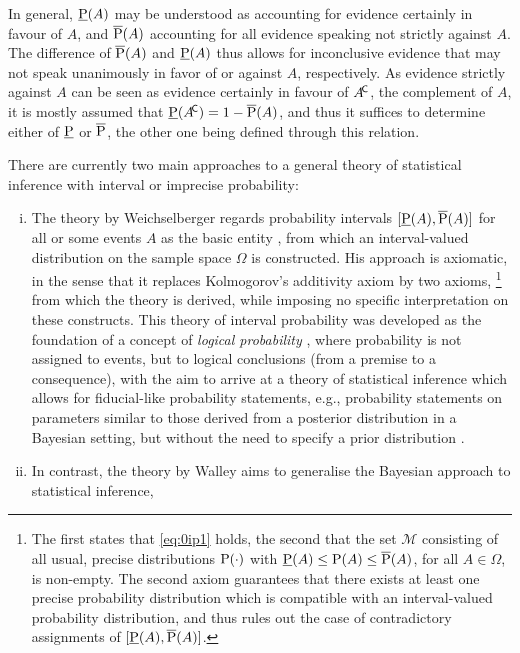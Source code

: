 In general, $\underline{\operatorname{P}}(A)$ may be understood as accounting for evidence certainly in favour of $A$,
and $\overline{\operatorname{P}}(A)$ accounting for all evidence speaking not strictly against $A$.
The difference of $\overline{\operatorname{P}}(A)$ and $\underline{\operatorname{P}}(A)$ thus allows for inconclusive evidence
that may not speak unanimously in favor of or against $A$, respectively.
As evidence strictly against $A$ can be seen as evidence certainly in favour of $A^{{\mbox{\!\scriptsize\textsf{C}}}}$,
the complement of $A$,
it is mostly assumed that $\underline{\operatorname{P}}(A^{{\mbox{\!\scriptsize\textsf{C}}}}) = 1 - \overline{\operatorname{P}}(A)$,
and thus it suffices to determine either of $\underline{\operatorname{P}}$ or $\overline{\operatorname{P}}$,
the other one being defined through this relation.

There are currently two main approaches to a general theory of statistical inference with interval or imprecise probability:
\begin{enumerate}[(i)]
\item The theory by Weichselberger \parencite*{2000:weichselberger, 2001:weichselberger}
regards probability intervals $[\underline{\operatorname{P}}(A), \overline{\operatorname{P}}(A)]$ for all or some events $A$ as the basic entity
\parencite[p.~646]{2011:IESS-ip},
from which an interval-valued distribution on the sample space $\Omega$ is constructed.
His approach is axiomatic, in the sense that it replaces Kolmogorov's \parencite*{1933:kolmogorov} additivity axiom by two axioms,%
\footnote{The first states that \eqref{eq:0ip1} holds,
the second that the set $\mathcal{M}$ consisting of all usual, precise distributions $\operatorname{P}(\cdot)$
with $\underline{\operatorname{P}}(A) \le \operatorname{P}(A) \le \overline{\operatorname{P}}(A)$, for all $A \in \Omega$, is non-empty.
The second axiom guarantees that there exists at least one precise probability distribution
which is compatible with an interval-valued probability distribution,
and thus rules out the case of contradictory assignments of $[\underline{\operatorname{P}}(A), \overline{\operatorname{P}}(A)]$.}
from which the theory is derived,
while imposing no specific interpretation on these constructs.
This theory of interval probability was developed
as the foundation of a concept of \emph{logical probability} \parencite{2007:weichselberger},
where probability is not assigned to events, but to logical conclusions (from a premise to a consequence),
with the aim to arrive at a theory of statistical inference
which allows for fiducial-like probability statements,
e.g., probability statements on parameters similar to those derived from a posterior distribution in a Bayesian setting,
but without the need to specify a prior distribution \parencite[see, e.g.,][]{2011:IESS-fiducial}.
\item In contrast, the theory by Walley \parencite*{1991:walley, 2000:walley::towards}
aims to generalise the Bayesian approach to statistical inference,

\end{enumerate}
